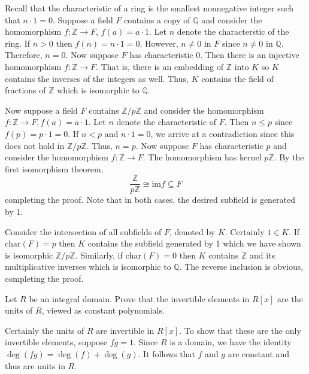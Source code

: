 \documentclass[../../master.tex]{subfiles}
\begin{document}
    \begin{solution}
        Recall that the characteristic of a ring is the smallest nonnegative
        integer such that $n \cdot 1 = 0$. Suppose a field $F$ contains a copy
        of $\mathbb{Q}$ and consider the homomorphism $f: \mathbb{Z} \to F$,
        $f(a) = a \cdot 1$. Let $n$ denote the characterstic of the ring. If $n
        > 0$ then $f(n) = n \cdot 1 = 0$. However, $n \neq 0$ in $F$ since $n
        \neq 0$ in $\mathbb{Q}$. Therefore, $n = 0$. Now suppose $F$ has
        characteristic 0. Then there is an injective homomorphism $f: \mathbb{Z}
        \to F$. That is, there is an embedding of $\mathbb{Z}$ into $K$ so $K$
        contains the inverses of the integers as well. Thus, $K$ contains the
        field of fractions of $\mathbb{Z}$ which is isomorphic to $\mathbb{Q}$.

        Now suppose a field $F$ contains $\mathbb{Z} / p\mathbb{Z}$ and consider
        the homomorphism $f: \mathbb{Z} \to F, f(a) = a \cdot 1$. Let $n$ denote
        the characteristic of $F$. Then $n \leq p$ since $f(p) = p \cdot 1 = 0$.
        If $n < p$ and $n \cdot 1 = 0$, we arrive at a contradiction since this
        does not hold in $\mathbb{Z} / p\mathbb{Z}$. Thus, $n = p$. Now suppose
        $F$ has characteristic $p$ and consider the homomorphism $f: \mathbb{Z}
        \to F$. The homomorphism has kernel $p\mathbb{Z}$. By the first
        isomorphism theorem,
        \[
            \frac{\mathbb{Z}}{p\mathbb{Z}} \cong \text{im} f \subseteq F
        \] 
        completing the proof. Note that in both cases, the desired subfield is
        generated by 1.

        Consider the intersection of all subfields of $F$, denoted by $K$.
        Certainly $1 \in K$. If $\text{char}(F) = p$ then $K$ contains the
        subfield generated by 1 which we have shown is isomorphic $\mathbb{Z} /
        p\mathbb{Z}$. Similarly, if $\text{char}(F) = 0$ then $K$ contains
        $\mathbb{Z}$ and its multiplicative inverses which is isomorphic to
        $\mathbb{Q}$. The reverse inclusion is obvious, completing the proof.
    \end{solution}

    \begin{problem}
        Let $R$ be an integral domain. Prove that the invertible elements in
        $R[x]$ are the units of $R$, viewed as constant polynomials.
    \end{problem}

    \begin{solution}
        Certainly the units of $R$ are invertible in $R[x]$. To show that these
        are the only invertible elements, suppose $fg = 1$. Since $R$ is a
        domain, we have the identity $\deg(fg) = \deg(f) + \deg(g)$. It follows
        that $f$ and $g$ are constant and thus are units in $R$.
    \end{solution}
\end{document}
